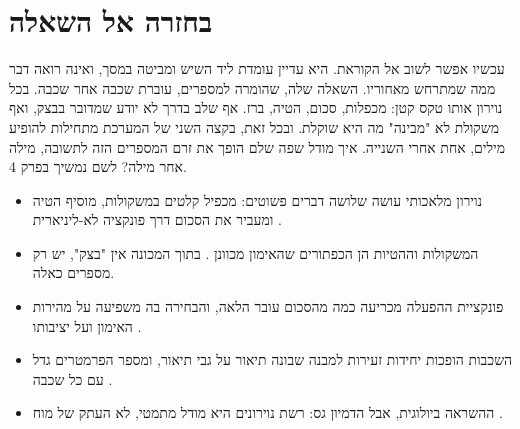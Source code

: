 \section{בחזרה אל השאלה}
עכשיו אפשר לשוב אל הקוראת. היא עדיין עומדת ליד השיש ומביטה במסך, ואינה רואה דבר ממה שמתרחש מאחוריו. השאלה שלה, שהומרה למספרים, עוברת שכבה אחר שכבה. בכל נוירון אותו טקס קטן: מכפלות, סכום, הטיה, ברז. אף שלב בדרך לא יודע שמדובר בבצק, ואף משקולת לא "מבינה" מה היא שוקלת. ובכל זאת, בקצה השני של המערכת מתחילות להופיע מילים, אחת אחרי השנייה.
איך מודל שפה שלם הופך את זרם המספרים הזה לתשובה, מילה אחר מילה? לשם נמשיך בפרק 4.
\begin{insightsbox}
\begin{itemize}
\item נוירון מלאכותי עושה שלושה דברים פשוטים: מכפיל קלטים במשקולות, מוסיף הטיה ומעביר את הסכום דרך פונקציה לא-ליניארית \cite{S-ch03-01}.
\item המשקולות וההטיות הן הכפתורים שהאימון מכוונן \cite{S-ch03-01,S-ch01-05}. בתוך המכונה אין "בצק", יש רק מספרים כאלה.
\item פונקציית ההפעלה מכריעה כמה מהסכום עובר הלאה, והבחירה בה משפיעה על מהירות האימון ועל יציבותו \cite{S-ch03-01}.
\item השכבות הופכות יחידות זעירות למבנה שבונה תיאור על גבי תיאור, ומספר הפרמטרים גדל עם כל שכבה \cite{S-ch03-01,S-ch01-05}.
\item ההשראה ביולוגית, אבל הדמיון גס: רשת נוירונים היא מודל מתמטי, לא העתק של מוח \cite{S-ch03-01}.
\end{itemize}
\end{insightsbox}
